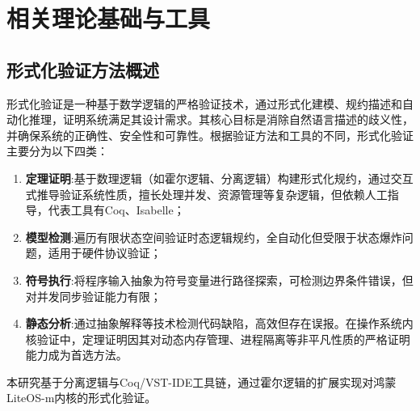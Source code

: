 \chapter{相关理论基础与工具}
\section{形式化验证方法概述}
\label{sec:formal-methods}
形式化验证是一种基于数学逻辑的严格验证技术，通过形式化建模、规约描述和自动化推理，证明系统满足其设计需求。其核心目标是消除自然语言描述的歧义性，并确保系统的正确性、安全性和可靠性。根据验证方法和工具的不同，形式化验证主要分为以下四类：
\begin{enumerate}
    \item \textbf{定理证明}:基于数理逻辑（如霍尔逻辑、分离逻辑）构建形式化规约，通过交互式推导验证系统性质，擅长处理并发、资源管理等复杂逻辑，但依赖人工指导，代表工具有Coq、Isabelle；
    \item \textbf{模型检测}:遍历有限状态空间验证时态逻辑规约，全自动化但受限于状态爆炸问题，适用于硬件协议验证；
    \item \textbf{符号执行}:将程序输入抽象为符号变量进行路径探索，可检测边界条件错误，但对并发同步验证能力有限；
    \item \textbf{静态分析}:通过抽象解释等技术检测代码缺陷，高效但存在误报。在操作系统内核验证中，定理证明因其对动态内存管理、进程隔离等非平凡性质的严格证明能力成为首选方法。
\end{enumerate}

本研究基于分离逻辑与Coq/VST-IDE工具链，通过霍尔逻辑的扩展实现对鸿蒙LiteOS-m内核的形式化验证。

